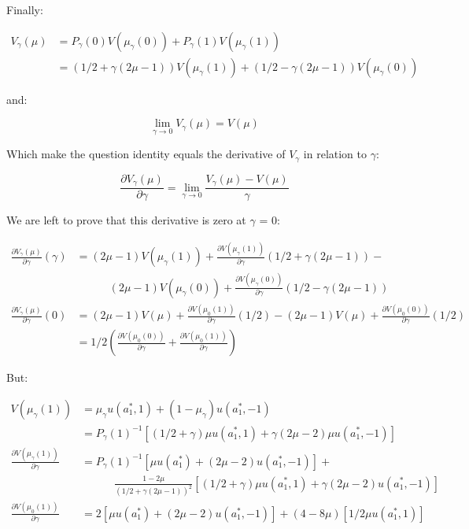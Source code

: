 \documentclass{article}
\begin{document}
Finally:

\[
\begin{split}
  V_\gamma(\mu) & = P_\gamma(0)V(\mu_\gamma(0)) + P_\gamma(1)V(\mu_\gamma(1)) \\
                & = (1/2 + \gamma(2\mu -1))V(\mu_\gamma(1)) +
                    (1/2 - \gamma(2\mu -1))V(\mu_\gamma(0))
\end{split}
\]

and:

\[
  \lim_{\gamma \to 0} V_\gamma(\mu) = V(\mu)
\]

Which make the question identity equals the derivative of $V_\gamma$ in relation
to $\gamma$:

\[
\frac{\partial V_\gamma(\mu)}{\partial \gamma} =
\lim_{\gamma \to 0} \frac{V_\gamma(\mu) - V(\mu)}{\gamma}
\]

We are left to prove that this derivative is zero at $\gamma$ = 0:

\[
\begin{split}
  \frac{\partial V_\gamma(\mu)}{\partial \gamma}(\gamma) & =
    (2\mu -1)V(\mu_\gamma(1)) +
    \frac{\partial V(\mu_\gamma(1))}{\partial \gamma}(1/2 + \gamma(2\mu - 1)) - \\
    & \qquad\quad
    (2\mu -1)V(\mu_\gamma(0)) +
    \frac{\partial V(\mu_\gamma(0))}{\partial \gamma}(1/2 - \gamma(2\mu - 1)) \\
  \frac{\partial V_\gamma(\mu)}{\partial \gamma}(0) & =
    (2\mu -1)V(\mu) +
    \frac{\partial V(\mu_0(1))}{\partial \gamma}(1/2) -
    (2\mu -1)V(\mu) +
    \frac{\partial V(\mu_0(0))}{\partial \gamma}(1/2) \\
  & =
    1/2 \left(\frac{\partial V(\mu_0(0))}{\partial \gamma} +
      \frac{\partial V(\mu_0(1))}{\partial \gamma}\right)
\end{split}
\]

But:

\[
\begin{split}
  V(\mu_\gamma(1)) & = \mu_\gamma u(a_1^*, 1) + (1 - \mu_\gamma) u(a_1^*, -1) \\
  & = P_\gamma(1)^{-1} 
    [(1/2 + \gamma)\mu u(a_1^*, 1) + \gamma(2\mu - 2)\mu u(a_1^*, -1)] \\
  \frac{\partial V(\mu_\gamma(1))}{\partial \gamma} & = P_\gamma(1)^{-1} 
    [\mu u(a_1^*) + (2\mu - 2)u(a_1^*, -1)] + \\
    & \qquad\quad
    \frac{1 - 2\mu}{(1/2 + \gamma(2\mu -1))^2} 
    [(1/2 + \gamma)\mu u(a_1^*,1) + \gamma(2\mu - 2) u(a_1^*, -1)] \\
  \frac{\partial V(\mu_0(1))}{\partial \gamma} & = 
    2[\mu u(a_1^*) + (2\mu - 2)u(a_1^*, -1)] +
    (4 - 8\mu)[1/2\mu u(a_1^*,1)]
\end{split}
\]
\end{document}
